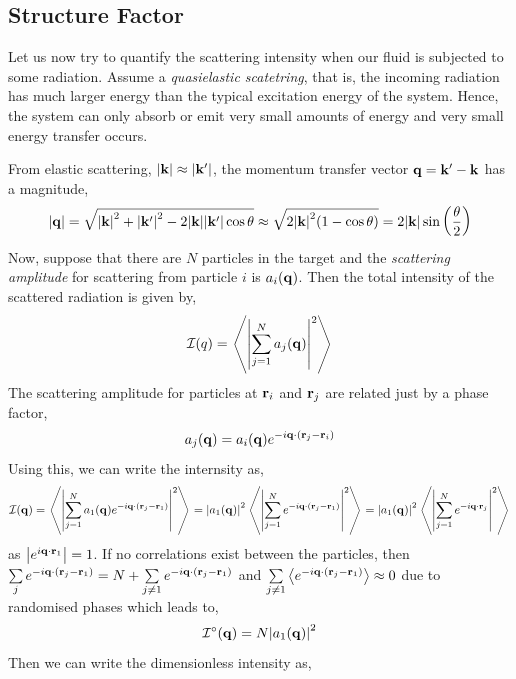 \subsection{Structure Factor}
Let us now try to quantify the scattering intensity when our fluid is subjected to some radiation. Assume a \textit{quasielastic scatetring}, that is, the incoming radiation has much larger energy than the typical excitation energy of the system. Hence, the system can only absorb or emit very small amounts of energy and very small energy transfer occurs. 
\begin{figure}[H]
    \centering 
    
\end{figure}
\noindent
From elastic scattering, $\abs{\vb{k}}\approx \abs{\vb{k}'}$, the momentum transfer vector $\vb{q} = \vb{k}'-\vb{k}$ has a magnitude,
$$\abs{\vb{q}}=\sqrt{\abs{\vb{k}}^2+\abs{\vb{k}'}^2 -2\abs{\vb{k}}\abs{\vb{k}'}\cos\theta} \approx \sqrt{2\abs{\vb{k}}^2\qty(1-\cos\theta)} = 2\abs{\vb{k}} \sin\qty(\frac{\theta}{2})$$
Now, suppose that there are $N$ particles in the target and the \textit{scattering amplitude} for scattering from particle $i$ is $a_i(\vb{q})$. Then the total intensity of the scattered radiation is given by,
$$\mathcal{I}(q) = \left\langle \abs{\sum\limits_{j=1}^N a_j(\vb{q})}^2 \right\rangle$$
The scattering amplitude for particles at $\vb{r}_i$ and $\vb{r}_j$ are related just by a phase factor,
$$a_j(\vb{q}) = a_i(\vb{q}) e^{-i\vb{q}\cdot (\vb{r}_j - \vb{r}_i)}$$
Using this, we can write the internsity as,
\begin{equation}
    \mathcal{I}(\vb{q}) = \left\langle \abs{\sum\limits_{j=1}^N a_1(\vb{q}) e^{-i\vb{q}\cdot (\vb{r}_j - \vb{r}_1)}}^2 \right\rangle=\abs{a_1(\vb{q})}^2\left\langle \abs{\sum\limits_{j=1}^N  e^{-i\vb{q}\cdot (\vb{r}_j - \vb{r}_1)}}^2 \right\rangle =\abs{a_1(\vb{q})}^2\left\langle \abs{\sum\limits_{j=1}^N  e^{-i\vb{q}\cdot \vb{r}_j}}^2 \right\rangle 
\end{equation}
as $\abs{e^{i\vb{q}\cdot \vb{r}_1}} =1$. If no correlations exist between the particles, then $\sum\limits_j e^{-i\vb{q}\cdot(\vb{r}_j-\vb{r}_1)} = N + \sum\limits_{j\neq 1}e^{-i\vb{q}\cdot(\vb{r}_j-\vb{r}_1)}$ and $\sum\limits_{j\neq 1} \left\langle e^{-i\vb{q}\cdot(\vb{r}_j-\vb{r}_1)} \right\rangle\approx 0$ due to randomised phases which leads to, 
$$\tensor*{\mathcal{I}}{^\circ}(\vb{q}) = N \abs{a_1(\vb{q})}^2$$
Then we can write the dimensionless intensity as, 
